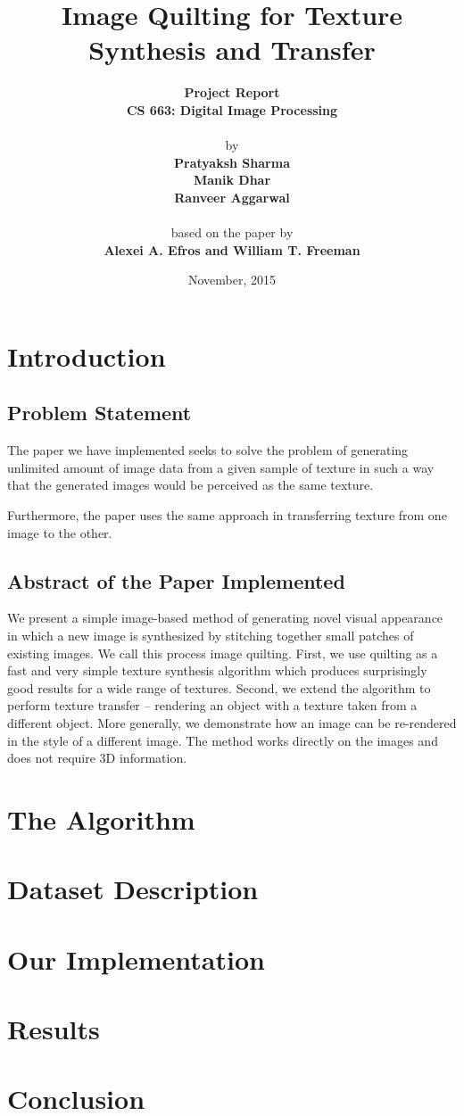 \documentclass[12pt,a4paper]{report}
\title{\textbf{Image Quilting for Texture Synthesis and Transfer}}
\author{
		\textbf{Project Report}\\
		\textbf{CS 663: Digital Image Processing}\\
		\\
		by\\
        \textbf{Pratyaksh Sharma}\\
		\textbf{Manik Dhar}\\
		\textbf{Ranveer Aggarwal}\\
		\\
		based on the paper by\\
		\textbf{Alexei A. Efros and William T. Freeman}
}
\date{November, 2015}
\begin{document}
\maketitle
\tableofcontents
\chapter{Introduction}
\section{Problem Statement}
The paper we have implemented seeks to solve the problem of generating unlimited amount of image data from a given sample of texture in such a way that the generated images would be perceived as the same texture.

Furthermore, the paper uses the same approach in transferring texture from one image to the other.

\section{Abstract of the Paper Implemented}
We present a simple image-based method of generating novel visual appearance in which a new image is synthesized by stitching together small patches of existing images. We call this process image quilting. First, we use quilting as a fast and very simple texture synthesis algorithm which produces surprisingly good results for a wide range of textures. Second, we extend the algorithm to perform texture transfer – rendering an object with a texture taken from a different object. More generally, we demonstrate how an image can be re-rendered in the style of a different image. The method works directly on the images and does not require 3D information.

\chapter{The Algorithm}

\chapter{Dataset Description}

\chapter{Our Implementation}

\chapter{Results}

\chapter{Conclusion}
\end{document}

